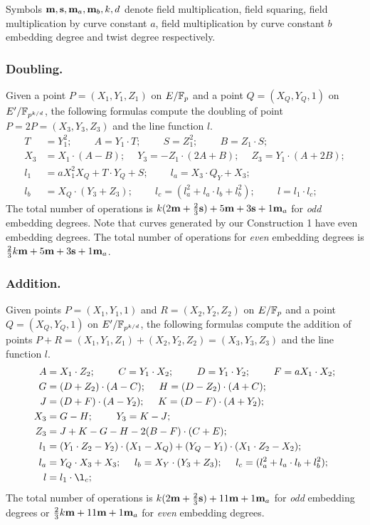 Symbols $\textbf{m}, \textbf{s}, \textbf{m}_{a}, \textbf{m}_{b}, k, d$ denote
field multiplication,
field squaring,
field multiplication by curve constant $a$,
field multiplication by curve constant $b$
embedding degree and
twist degree respectively.

\subsubsection{Doubling.}
Given a point $P = (X_1,Y_1,Z_1)$ on $E/\mathbb{F}_{p}$ and a point $Q = (X_Q,Y_Q,1)$ on $E'/\mathbb{F}_{p^{k/d}}$,
the following formulas compute the doubling of point $P = 2P = (X_3,Y_3,Z_3)$ and the line function $l$.
\begin{align*}
T &= Y_1^2;\	\qquad	A = Y_1 \cdot T;\	\qquad
S = Z_1 ^ 2;\	\qquad	B = Z_1 \cdot S;\\
X_3 &= X_1 \cdot (A - B);\	\quad
Y_3 = -Z_1 \cdot (2A + B);\	\quad
Z_3 = Y_1 \cdot (A + 2B);\\
l_1 &= a X_1^2 X_Q + T \cdot Y_Q + S;\	\qquad
l_a = X_3 \cdot Q_Y + X_3;	\\
l_b &= X_Q \cdot (Y_3 + Z_3);\			\qquad
l_c = (l_a^2 + l_a \cdot l_b + l_b^2);\		\qquad
l = l_1 \cdot l_c;
\end{align*}
The total number of operations is
$ k(2\textbf{m} + \frac{2}{3}\textbf{s}) + 5\textbf{m} +3\textbf{s} + 1\textbf{m}_a$ for {\it{odd}} embedding degrees.
Note that curves generated by our Construction 1 have even embedding degrees.
The total number of operations for {\it{even}} embedding degrees is
$ \frac{2}{3}k\textbf{m} + 5\textbf{m} +3\textbf{s} + 1\textbf{m}_a$.

\subsubsection{Addition.}
Given points $P = (X_1,Y_1,1)$ and $R = (X_2,Y_2,Z_2)$ on $E/\mathbb{F}_{p}$ and a point $Q = (X_Q,Y_Q,1)$ on $E'/\mathbb{F}_{p^{k/d}}$,
the following formulas compute the addition of points $P + R = (X_1,Y_1,Z_1) + (X_2,Y_2,Z_2) = (X_3,Y_3,Z_3)$ and the line function $l$.
\begin{align*}
A &= X_1 \cdot Z_2;\	\qquad
C = Y_1 \cdot X_2;\	\qquad
D = Y_1 \cdot Y_2;\	\qquad
F = a X_1 \cdot X_2;\\
G &= (D + Z_2) \cdot (A - C);\	\quad
H = (D - Z_2) \cdot (A + C);\\
J &= (D + F) \cdot (A - Y_2);\	\quad
K = (D - F) \cdot (A + Y_2);\\
X_3 &= G - H;\	\qquad
Y_3 = K - J;\\
Z_3 &= J + K - G - H - 2(B - F) \cdot (C + E);\\
l_1 &= (Y_1 \cdot Z_2 - Y_2) \cdot (X_1 - X_Q) + (Y_Q - Y_1) \cdot (X_1 \cdot Z_2 - X_2);\\
l_a &= Y_Q \cdot X_3 + X_3;\	\quad
l_b = X_Y \cdot (Y_3 + Z_3);\	\quad
l_c = (l_a^2 + l_a \cdot l_b + l_b^2);\\
l &= l_1 \cdot \l_c;
\end{align*}
The total number of operations is
$ k(2\textbf{m} + \frac{2}{3}\textbf{s}) + 11\textbf{m} + 1\textbf{m}_a$ for {\it{odd}} embedding degrees or
$ \frac{2}{3}k\textbf{m} + 11\textbf{m} + 1\textbf{m}_a$ for {\it{even}} embedding degrees.


